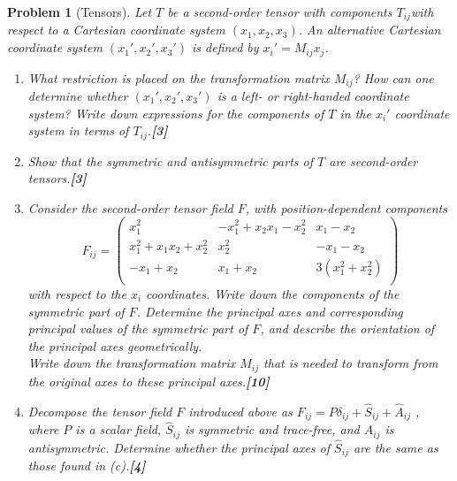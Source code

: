 \documentclass[a4paper]{article}
\theoremstyle{new}
\newtheorem{qns}{Problem}[section]
\begin{document}
\newpage
\begin{qns}[Tensors]
Let $T$ be a second-order tensor with components $T_{ij }$with respect to a Cartesian coordinate system $(x_1, x_2, x_3)$. An alternative Cartesian coordinate system $(x_1',x_2',x_3')$ is defined by $x_i'=M_{ij}x_j$.
\begin{enumerate}[label=(\alph*)]
\item What restriction is placed on the transformation matrix $M_{ij}$? How can one determine whether $(x_1',x_2',x_3')$ is a left- or right-handed coordinate system? Write down expressions for the components of $T$ in the $x_i'$ coordinate system in terms of $T_{ij}$.\hfill\textbf{[3]}
\item Show that the symmetric and antisymmetric parts of $T$ are second-order tensors.\hfill\textbf{[3]}
\item Consider the second-order tensor field $F$, with position-dependent components
$$F_{ij}=\begin{pmatrix}x_1^2&-x_1^2+x_2x_1-x_2^2&x_1-x_2\\x_1^2+x_1x_2+x_2^2&x_2^2&-x_1-x_2\\-x_1+x_2&x_1+x_2&3(x_1^2+x_2^2)\\\end{pmatrix}$$
with respect to the $x_i$ coordinates. Write down the components of the symmetric part of $F$. Determine the principal axes and corresponding principal values of the symmetric part of $F$, and describe the orientation of the principal axes geometrically.\\[5pt]
Write down the transformation matrix $M_{ij}$ that is needed to transform from the original axes to these principal axes.\hfill\textbf{[10]}
\item Decompose the tensor field $F$ introduced above as $F_{ij}=P\delta_{ij}+\hat{S}_{ij}+\hat{A}_{ij}$ , where $P$ is a scalar field, $\hat{S}_{ij}$ is symmetric and trace-free, and $\hat{A}_{ij}$ is antisymmetric. Determine whether the principal axes of $\hat{S}_{ij}$ are the same as those found in (c).\hfill\textbf{[4]}
\end{enumerate}
\end{qns}
\end{document}

